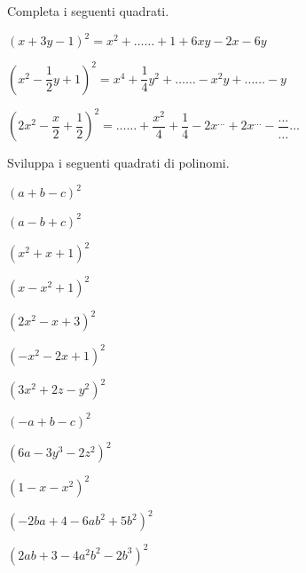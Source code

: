 \begin{esercizio}
 \label{ese:11.11}
Completa i seguenti quadrati.

\begin{enumeratea}
\spazielenx
\item $\left(x+3y-1\right)^{2}=x^{2}+\ldots \ldots +1+6xy-2x-6y$
\item 
$\left(x^{2}-\dfrac{1}{2}y+1\right)^{2}=x^{4}+\dfrac{1}{4}y^{2}+\ldots\ldots 
-x^{2}y+\ldots\ldots -y$
\item $\left(2x^{2}-\dfrac{x}{2}+\dfrac{1}{2}\right)^{2}=\ldots\ldots 
+\dfrac{x^{2}}{4}%
+\dfrac{1}{4}-2x^{\ldots }+2x^{\ldots}-\dfrac{\ldots}{\ldots}\ldots $
\end{enumeratea}
\end{esercizio}

\begin{esercizio}
 \label{ese:11.12}
Sviluppa i seguenti quadrati di polinomi.

\begin{multicols}{3}
\begin{enumeratea}
\item $\left(a+b-c\right)^{2}$
\item $\left(a-b+c\right)^{2}$
\item $\left(x^{2}+x+1\right)^{2}$
\item $\left(x-x^{2}+1\right)^{2}$
\item $\left(2x^{2}-x+3\right)^{2}$
\item $\left(-x^{2}-2x+1\right)^{2}$
\item $\left(3x^{2}+2z-y^{2}\right)^{2}$
\item $\left(-a+b-c\right)^{2}$
\item $\left(6a-3y^{3}-2z^{2}\right)^{2}$
\item $\left(1-x-x^{2}\right)^{2}$
\item $\left(-2{ba}+4-6{ab}^{2}+5b^{2}\right)^{2}$
\item $\left(2{ab}+3-4a^{2}b^{2}-2b^{3}\right)^{2}$
\end{enumeratea}
\end{multicols}
\end{esercizio}


